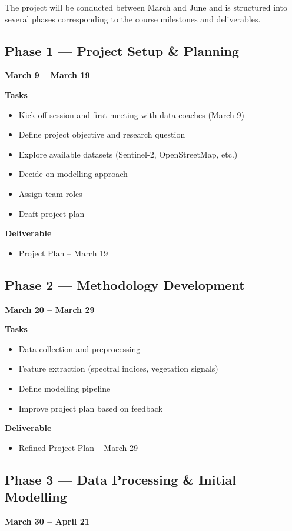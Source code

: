 The project will be conducted between March and June and is structured into several phases corresponding to the course milestones and deliverables.

\subsection*{Phase 1 — Project Setup \& Planning}
\textbf{March 9 – March 19}

\textbf{Tasks}
\begin{itemize}
\item Kick-off session and first meeting with data coaches (March 9)
\item Define project objective and research question
\item Explore available datasets (Sentinel-2, OpenStreetMap, etc.)
\item Decide on modelling approach
\item Assign team roles
\item Draft project plan
\end{itemize}

\textbf{Deliverable}
\begin{itemize}
\item Project Plan – March 19
\end{itemize}


\subsection*{Phase 2 — Methodology Development}
\textbf{March 20 – March 29}

\textbf{Tasks}
\begin{itemize}
\item Data collection and preprocessing
\item Feature extraction (spectral indices, vegetation signals)
\item Define modelling pipeline
\item Improve project plan based on feedback
\end{itemize}

\textbf{Deliverable}
\begin{itemize}
\item Refined Project Plan – March 29
\end{itemize}


\subsection*{Phase 3 — Data Processing \& Initial Modelling}
\textbf{March 30 – April 21}

